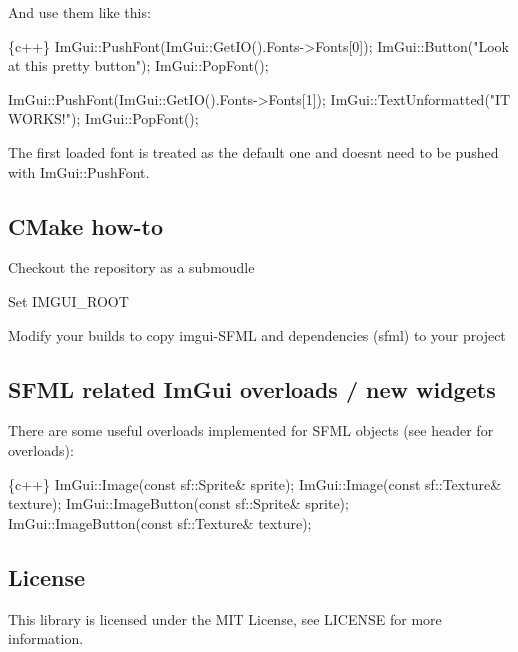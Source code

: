 \begin{DoxyItemize}
\item And use them like this\+:
\end{DoxyItemize}


\begin{DoxyCode}
\{c++\}
ImGui::PushFont(ImGui::GetIO().Fonts->Fonts[0]);
ImGui::Button("Look at this pretty button");
ImGui::PopFont();

ImGui::PushFont(ImGui::GetIO().Fonts->Fonts[1]);
ImGui::TextUnformatted("IT WORKS!");
ImGui::PopFont();
\end{DoxyCode}


The first loaded font is treated as the default one and doesn\textquotesingle{}t need to be pushed with {\ttfamily Im\+Gui\+::\+Push\+Font}.

\subsection*{C\+Make how-\/to }


\begin{DoxyItemize}
\item Checkout the repository as a submoudle
\item Set I\+M\+G\+U\+I\+\_\+\+R\+O\+OT
\item Modify your builds to copy imgui-\/\+S\+F\+ML and dependencies (sfml) to your project 

\end{DoxyItemize}

\subsection*{S\+F\+ML related Im\+Gui overloads / new widgets }

There are some useful overloads implemented for S\+F\+ML objects (see header for overloads)\+: 
\begin{DoxyCode}
\{c++\}
ImGui::Image(const sf::Sprite& sprite);
ImGui::Image(const sf::Texture& texture);
ImGui::ImageButton(const sf::Sprite& sprite);
ImGui::ImageButton(const sf::Texture& texture);
\end{DoxyCode}


\subsection*{License }

This library is licensed under the M\+IT License, see L\+I\+C\+E\+N\+SE for more information. 